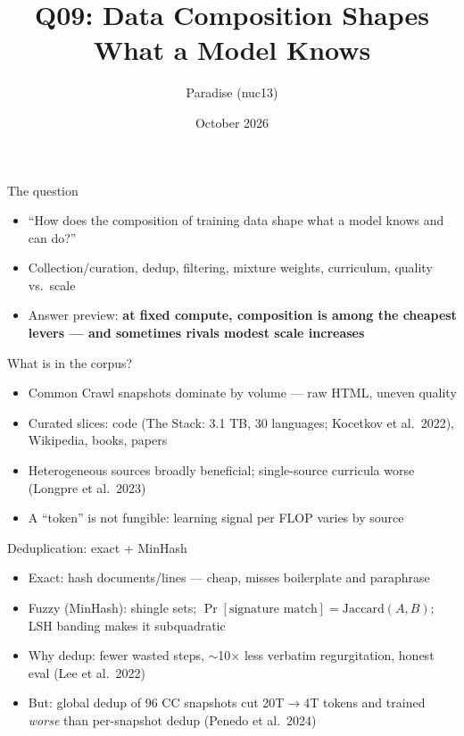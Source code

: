 \documentclass[aspectratio=169,11pt]{beamer}
\title{Q09: Data Composition Shapes What a Model Knows}
\author{Paradise (nuc13)}
\date{October 2026}
\begin{document}
\frame{\titlepage}

\begin{frame}{The question}
\begin{itemize}
\item ``How does the composition of training data shape what a model knows and can do?''
\item Collection/curation, dedup, filtering, mixture weights, curriculum, quality vs.\ scale
\item Answer preview: \textbf{at fixed compute, composition is among the cheapest levers --- and sometimes rivals modest scale increases}
\end{itemize}
\end{frame}

\begin{frame}{What is in the corpus?}
\begin{itemize}
\item Common Crawl snapshots dominate by volume --- raw HTML, uneven quality
\item Curated slices: code (The Stack: 3.1 TB, 30 languages; Kocetkov et al.\ 2022), Wikipedia, books, papers
\item Heterogeneous sources broadly beneficial; single-source curricula worse (Longpre et al.\ 2023)
\item A ``token'' is not fungible: learning signal per FLOP varies by source
\end{itemize}
\end{frame}

\begin{frame}{Deduplication: exact + MinHash}
\begin{itemize}
\item Exact: hash documents/lines --- cheap, misses boilerplate and paraphrase
\item Fuzzy (MinHash): shingle sets; $\Pr[\text{signature match}] = \text{Jaccard}(A,B)$; LSH banding makes it subquadratic
\item Why dedup: fewer wasted steps, $\sim$10$\times$ less verbatim regurgitation, honest eval (Lee et al.\ 2022)
\item But: global dedup of 96 CC snapshots cut 20T$\to$4T tokens and trained \emph{worse} than per-snapshot dedup (Penedo et al.\ 2024)
\end{itemize}
\end{frame}
\end{document}
